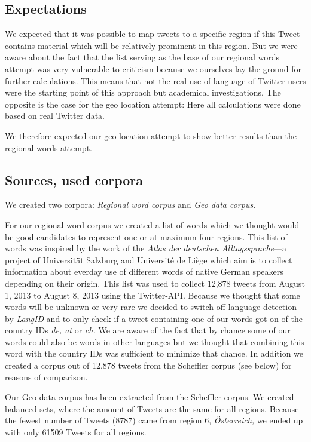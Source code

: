 \documentclass[../Main.tex]{subfiles}
\begin{document}
\subsection{Expectations}
We expected that it was possible to map tweets to a specific region if this Tweet contains material which will be relatively prominent in this region. But we were aware about the fact that the list serving as the base of our regional words attempt was very vulnerable to criticism because we ourselves lay the ground for further calculations. This means that not the real use of language of Twitter users were the starting point of this approach but academical investigations. The opposite is the case for the geo location attempt: Here all calculations were done based on real Twitter data.

We therefore expected our geo location attempt to show better results than the regional words attempt.

\subsection{Sources, used corpora}
We created two corpora: \emph{Regional word corpus} and \emph{Geo data corpus}.

For our regional word corpus we created a list of words which we thought would be good candidates to represent one or at maximum four regions. This list of words was inspired by the work of the \emph{Atlas der deutschen Alltagssprache}---a project of Universität Salzburg and Université de Liège which aim is to collect information about everday use of different words of native German speakers depending on their origin. This list was used to collect 12,878 tweets from August 1, 2013 to August 8, 2013 using the Twitter-API. Because we thought that some words will be unknown or very rare we decided to switch off language detection by \emph{LangID} and to only check if a tweet containing one of our words got on of the country IDs \textit{de, at} or \textit{ch.} We are aware of the fact that by chance some of our words could also be words in other languages but we thought that combining this word with the country IDs was sufficient to minimize that chance. In addition we created a corpus out of 12,878 tweets from the Scheffler corpus (see below) for reasons of comparison.

Our Geo data corpus has been extracted from the Scheffler corpus.
We created balanced sets, where the amount of Tweets are the same for all regions. Because the fewest number of Tweets (8787) came from region 6, \textit{Österreich,} we ended up with only 61509 Tweets for all regions.
\end{document}
